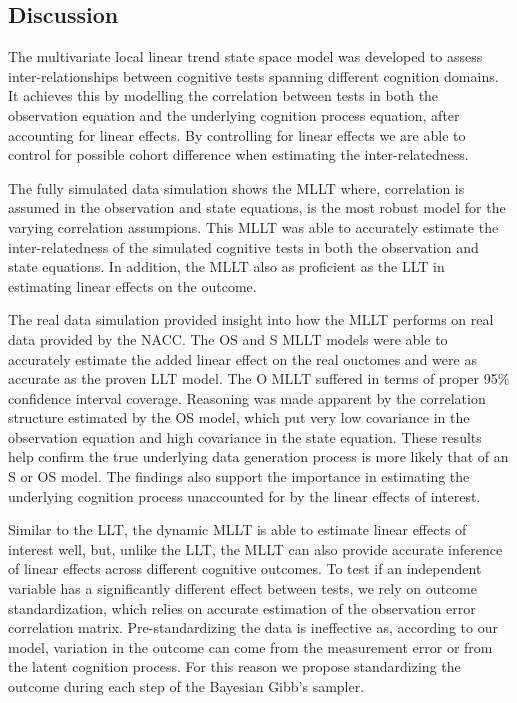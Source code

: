 \documentclass[
]{article}
\author{}
\date{\vspace{-2.5em}}
\begin{document}
\hypertarget{discussion}{%
\subsection{Discussion}\label{discussion}}

The multivariate local linear trend state space model was developed to assess inter-relationships between cognitive tests spanning different cognition domains. It achieves this by modelling the correlation between tests in both the observation equation and the underlying cognition process equation, after accounting for linear effects. By controlling for linear effects we are able to control for possible cohort difference when estimating the inter-relatedness.

The fully simulated data simulation shows the MLLT where, correlation is assumed in the observation and state equations, is the most robust model for the varying correlation assumpions. This MLLT was able to accurately estimate the inter-relatedness of the simulated cognitive tests in both the observation and state equations. In addition, the MLLT also as proficient as the LLT in estimating linear effects on the outcome.

The real data simulation provided insight into how the MLLT performs on real data provided by the NACC. The OS and S MLLT models were able to accurately estimate the added linear effect on the real ouctomes and were as accurate as the proven LLT model. The O MLLT suffered in terms of proper 95\% confidence interval coverage. Reasoning was made apparent by the correlation structure estimated by the OS model, which put very low covariance in the observation equation and high covariance in the state equation. These results help confirm the true underlying data generation process is more likely that of an S or OS model. The findings also support the importance in estimating the underlying cognition process unaccounted for by the linear effects of interest.

Similar to the LLT, the dynamic MLLT is able to estimate linear effects of interest well, but, unlike the LLT, the MLLT can also provide accurate inference of linear effects across different cognitive outcomes. To test if an independent variable has a significantly different effect between tests, we rely on outcome standardization, which relies on accurate estimation of the observation error correlation matrix. Pre-standardizing the data is ineffective as, according to our model, variation in the outcome can come from the measurement error or from the latent cognition process. For this reason we propose standardizing the outcome during each step of the Bayesian Gibb's sampler.
\end{document}
